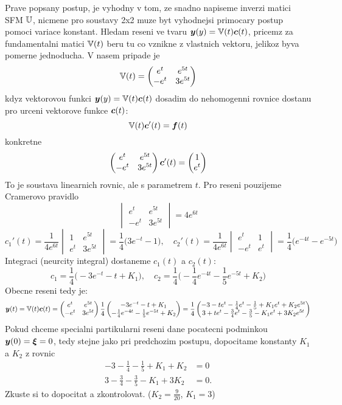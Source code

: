 Prave popsany postup, je vyhodny v tom, ze snadno napiseme inverzi matici
SFM ${\mathbb{U}}$, nicmene pro soustavy 2x2 muze byt vyhodnejsi primocary postup 
pomoci variace konstant. Hledam reseni ve tvaru $\mathbf{\boldsymbol{y}}(y)={\mathbb{V}}(t) \mathbf{\boldsymbol{c}}(t)$,
pricemz za fundamentalni matici ${\mathbb{V}}(t)$ beru tu co vznikne z vlastnich vektoru,
jelikoz byva pomerne jednoducha. V nasem pripade je 
\[
  {\mathbb{V}}(t)=
  \begin{pmatrix}
    e^t&e^{5t}\\-e^{t}&3e^{5t}
  \end{pmatrix}
\]
kdyz vektorovou funkci $\mathbf{\boldsymbol{y}}(y)={\mathbb{V}}(t) \mathbf{\boldsymbol{c}}(t)$ dosadim do nehomogenni rovnice 
dostanu pro urceni vektorove funkce $\mathbf{\boldsymbol{c}}(t)$:
\[
  {\mathbb{V}}(t)\mathbf{\boldsymbol{c}}'(t)=\mathbf{\boldsymbol{f}}(t)
\]
konkretne
\[
  \begin{pmatrix}
    e^t&e^{5t}\\-e^{t}&3e^{5t}
  \end{pmatrix}
  \mathbf{\boldsymbol{c}}'(t)=
  \begin{pmatrix}
     1\\e^t
   \end{pmatrix}
\]
To je soustava linearnich rovnic, ale s parametrem $t$. Pro reseni pouzijeme Cramerovo pravidlo
\[
  \begin{vmatrix}
    e^t&e^{5t}\\-e^{t}&3e^{5t}
  \end{vmatrix}=4e^{6t}
\]
\[
  c_1'(t)=\frac1{4e^{6t}}
  \begin{vmatrix}
    1&e^{5t}\\e^t&3e^{5t}
  \end{vmatrix}=\frac14\big(3e^{-t}-1\big),\quad
  c_2'(t)=\frac1{4e^{6t}}
  \begin{vmatrix}
    e^t&1\\-e^{t}&e^{t}
  \end{vmatrix}=\frac14\big(e^{-4t}-e^{-5t}\big)
\]
Integraci (neurcity integral) dostaneme $c_1(t)$ a $c_2(t)$:
\[
  c_1=\frac14\big(-3e^{-t}-t+K_1\big),\quad c_2=\frac14\big(-\frac14e^{-4t}-\frac15e^{-5t}+K_2\big)
\]
Obecne reseni tedy je:
\[
  \mathbf{\boldsymbol{y}}(t)={\mathbb{V}}(t)\mathbf{\boldsymbol{c}}(t)=
  \begin{pmatrix}
    e^t&e^{5t}\\-e^{t}&3e^{5t}
  \end{pmatrix}
  \frac14
  \begin{pmatrix}
    -3e^{-t}-t+K_1\\
    -\frac14e^{-4t}-\frac15e^{-5t}+K_2
  \end{pmatrix}
 =\frac14
  \begin{pmatrix}
     -3-te^t-\frac14e^t-\frac15+K_1e^t+K_2e^{5t}\\
     3+te^t-\frac34e^t-\frac35-K_1e^t+3K_2e^{5t}
  \end{pmatrix}
\]
Pokud chceme specialni partikularni reseni dane pocatecni podminkou $\mathbf{\boldsymbol{y}}(0)=\mathbf{\boldsymbol{\xi}}=0$,
tedy stejne jako pri predchozim postupu, dopocitame konstanty $K_1$ a $K_2$ z rovnic
\begin{align*}
  -3-\frac14-\frac15+K_1+K_2&=0\\
  3-\frac34-\frac35-K_1+3K_2&=0.
\end{align*}
Zkuste si to dopocitat a zkontrolovat. ($K_2=\frac9{20}$, $K_1=3$)

